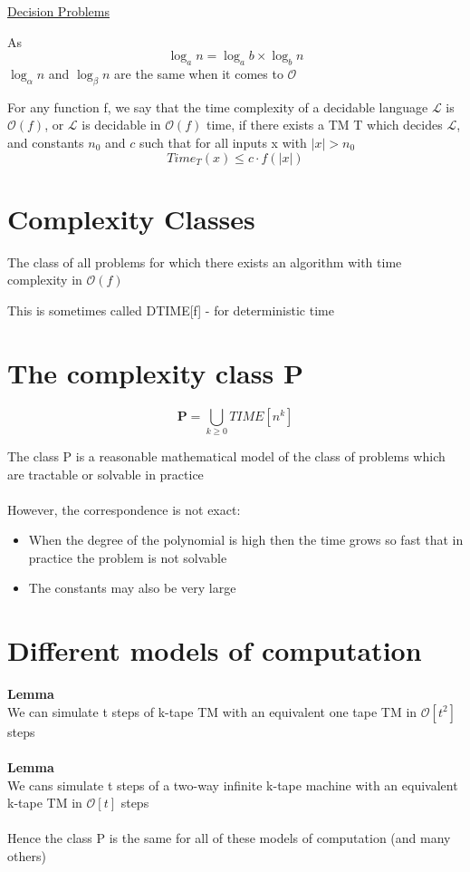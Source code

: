 \documentclass{article}[18pt]
\begin{document}
\begin{center}
\underline{\huge Decision Problems}
\end{center}

As
$$\log_an=\log_ab \times \log_bn$$
$\log_\alpha n$ and $\log_\beta n$ are the same when it comes to $\mathcal{O}$

\begin{definition}
	For any function f, we say that the time complexity of a decidable language $\mathcal{L}$ is $\mathcal{O}(f)$, or $\mathcal{L}$ is decidable in $\mathcal{O}(f)$ time, if there exists a TM T which decides $\mathcal{L}$, and constants $n_0$ and $c$ such that for all inputs x with $|x|>n_0$
	$$Time_T(x)\leqslant c\cdot f(|x|)$$
\end{definition}
\section{Complexity Classes}
\begin{definition}
	The class of all problems for which there exists an algorithm with time complexity in $\mathcal{O}(f)$
\end{definition}
This is sometimes called DTIME[f] - for deterministic time
\section{The complexity class P}
\begin{definition}[P]
$$
\mathbf{P}=\bigcup_{k \geq 0} T I M E\left[n^{k}\right]
$$
\end{definition}
The class P is a reasonable mathematical model of the class of problems which are tractable or solvable in practice\\
\\
However, the correspondence is not exact:
\begin{itemize}
	\item When the degree of the polynomial is high then the time grows so fast that in practice the problem is not solvable
	\item The constants may also be very large
\end{itemize}
\section{Different models of computation}
\textbf{Lemma}\\
We can simulate t steps of k-tape TM with an equivalent one tape TM in $\mathcal{O}[t^2]$ steps\\
\\
\textbf{Lemma}\\
We cans simulate t steps of a two-way infinite k-tape machine with an equivalent k-tape TM in $\mathcal{O}[t]$ steps\\
\\
Hence the class P is the same for all of these models of computation (and many others)
\end{document}

